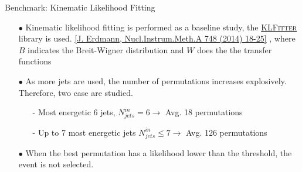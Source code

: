 \begin{frame}[fragile]{Benchmark: Kinematic Likelihood Fitting}
  \begin{itemize}
    \item[$\bullet$]
        Kinematic likelihood fitting is performed as a baseline study,
        the \href{https://github.com/KLFitter/KLFitter}{\textsc{KLFitter}} library is used.
        {\scriptsize \href{https://www.sciencedirect.com/science/article/pii/S0168900214001855?via\%3Dihub}{[J. Erdmann, Nucl.Instrum.Meth.A 748 (2014) 18-25]}}
        ,
        {\footnotesize where $B$ indicates the Breit-Wigner distribution and $W$ does the the transfer functions}
    \smallskip

    \item[$\bullet$]
        As more jets are used, the number of permutations increases explosively.
        Therefore, two case are studied.
              \begin{itemize}
                  \item[-] Most energetic 6 jets, $N_{jets}^{in} = 6 \rightarrow $ Avg. 18 permutations
                  \item[-] Up to 7 most energetic jets $N_{jets}^{in} \leq 7 \rightarrow$  Avg. 126 permutations
              \end{itemize}
    \smallskip

    \item[$\bullet$]
        When the best permutation has a likelihood lower than the threshold, the event is not selected.
  \end{itemize}

\end{frame}


